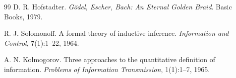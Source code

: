 \documentclass[12pt,a4paper]{article}
\theoremstyle{definition}
\begin{document}
\begin{thebibliography}{99}
D. R. Hofstadter.
\newblock \textit{G\"{o}del, Escher, Bach: An Eternal Golden Braid}.
\newblock Basic Books, 1979.

R. J. Solomonoff.
\newblock A formal theory of inductive inference.
\newblock \textit{Information and Control}, 7(1):1--22, 1964.

A. N. Kolmogorov.
\newblock Three approaches to the quantitative definition of information.
\newblock \textit{Problems of Information Transmission}, 1(1):1--7, 1965.

\end{thebibliography}
\end{document}
